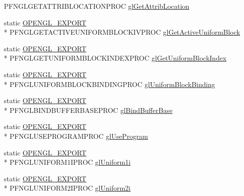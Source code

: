 \begin{DoxyCompactItemize}
P\+F\+N\+G\+L\+G\+E\+T\+A\+T\+T\+R\+I\+B\+L\+O\+C\+A\+T\+I\+O\+N\+P\+R\+O\+C \hyperlink{class_agmd_1_1_g_l_driver_ab0ee03cd9bb5ef2d908ba7d9fd18bb67}{gl\+Get\+Attrib\+Location}
\item 
static \hyperlink{_config_8h_a77401aa3bc0a379879047c1bd30f262e}{O\+P\+E\+N\+G\+L\+\_\+\+E\+X\+P\+O\+R\+T} \\*
P\+F\+N\+G\+L\+G\+E\+T\+A\+C\+T\+I\+V\+E\+U\+N\+I\+F\+O\+R\+M\+B\+L\+O\+C\+K\+I\+V\+P\+R\+O\+C \hyperlink{class_agmd_1_1_g_l_driver_a6340d495bef50555a94a3f0a841ff8e7}{gl\+Get\+Active\+Uniform\+Block}
\item 
static \hyperlink{_config_8h_a77401aa3bc0a379879047c1bd30f262e}{O\+P\+E\+N\+G\+L\+\_\+\+E\+X\+P\+O\+R\+T} \\*
P\+F\+N\+G\+L\+G\+E\+T\+U\+N\+I\+F\+O\+R\+M\+B\+L\+O\+C\+K\+I\+N\+D\+E\+X\+P\+R\+O\+C \hyperlink{class_agmd_1_1_g_l_driver_abdab09833a0bc1b12b6164ec8376b9fd}{gl\+Get\+Uniform\+Block\+Index}
\item 
static \hyperlink{_config_8h_a77401aa3bc0a379879047c1bd30f262e}{O\+P\+E\+N\+G\+L\+\_\+\+E\+X\+P\+O\+R\+T} \\*
P\+F\+N\+G\+L\+U\+N\+I\+F\+O\+R\+M\+B\+L\+O\+C\+K\+B\+I\+N\+D\+I\+N\+G\+P\+R\+O\+C \hyperlink{class_agmd_1_1_g_l_driver_ab551555cb6b30708df22f49803beef21}{gl\+Uniform\+Block\+Binding}
\item 
static \hyperlink{_config_8h_a77401aa3bc0a379879047c1bd30f262e}{O\+P\+E\+N\+G\+L\+\_\+\+E\+X\+P\+O\+R\+T} \\*
P\+F\+N\+G\+L\+B\+I\+N\+D\+B\+U\+F\+F\+E\+R\+B\+A\+S\+E\+P\+R\+O\+C \hyperlink{class_agmd_1_1_g_l_driver_ace18401eaa5492bfe5b7ca07daa80b4f}{gl\+Bind\+Buffer\+Base}
\item 
static \hyperlink{_config_8h_a77401aa3bc0a379879047c1bd30f262e}{O\+P\+E\+N\+G\+L\+\_\+\+E\+X\+P\+O\+R\+T} \\*
P\+F\+N\+G\+L\+U\+S\+E\+P\+R\+O\+G\+R\+A\+M\+P\+R\+O\+C \hyperlink{class_agmd_1_1_g_l_driver_ae35ed536290b155fb6430154ce4e87a3}{gl\+Use\+Program}
\item 
static \hyperlink{_config_8h_a77401aa3bc0a379879047c1bd30f262e}{O\+P\+E\+N\+G\+L\+\_\+\+E\+X\+P\+O\+R\+T} \\*
P\+F\+N\+G\+L\+U\+N\+I\+F\+O\+R\+M1\+I\+P\+R\+O\+C \hyperlink{class_agmd_1_1_g_l_driver_a6e3ddd5dda5dfc99a0ee447235889648}{gl\+Uniform1i}
\item 
static \hyperlink{_config_8h_a77401aa3bc0a379879047c1bd30f262e}{O\+P\+E\+N\+G\+L\+\_\+\+E\+X\+P\+O\+R\+T} \\*
P\+F\+N\+G\+L\+U\+N\+I\+F\+O\+R\+M2\+I\+P\+R\+O\+C \hyperlink{class_agmd_1_1_g_l_driver_af0d2b6c60223719735c960bf5edb79f1}{gl\+Uniform2i}

\end{DoxyCompactItemize}
